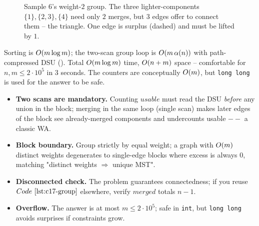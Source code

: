 \begin{figure}[H]
\centering
{}
\caption{Sample 6's weight-\(2\) group.  The three lighter-components
\(\{1\},\{2,3\},\{4\}\) need only \(2\) merges, but \(3\) edges offer to connect
them -- the triangle.  One edge is surplus (dashed) and must be lifted by \(1\).}
\label{fig:c17-groups}
\end{figure}

\begin{complexitybox}
Sorting is \(O(m\log m)\); the two-scan group loop is \(O(m\,\alpha(n))\)
with path-compressed DSU ().  Total \(O(m\log m)\) time,
\(O(n+m)\) space -- comfortable for \(n,m\le 2\cdot 10^5\) in 3 seconds.  The
counters are conceptually \(O(m)\), but \texttt{long long} is used for the
answer to be safe.
\end{complexitybox}

\begin{hardeningbox}
\begin{itemize}[nosep,leftmargin=1.4em]
\item \textbf{Two scans are mandatory.}  Counting \(\mathit{usable}\) must read the
      DSU \emph{before} any union in the block; merging in the same loop (single
      scan) makes later edges of the block see already-merged components and
      undercounts usable \(--\) a classic WA.
\item \textbf{Block boundary.}  Group strictly by equal weight; a graph with
      \(O(m)\) distinct weights degenerates to single-edge blocks where excess
      is always \(0\), matching "distinct weights \(\Rightarrow\) unique MST".
\item \textbf{Disconnected check.}  The problem guarantees connectedness; if you
      reuse \(\coderef{c17-group}\) elsewhere, verify \(\mathit{merged}\) totals
      \(n-1\).
\item \textbf{Overflow.}  The answer is at most \(m\le 2\cdot 10^5\); safe in
      \texttt{int}, but \texttt{long long} avoids surprises if constraints grow.
\end{itemize}
\end{hardeningbox}

